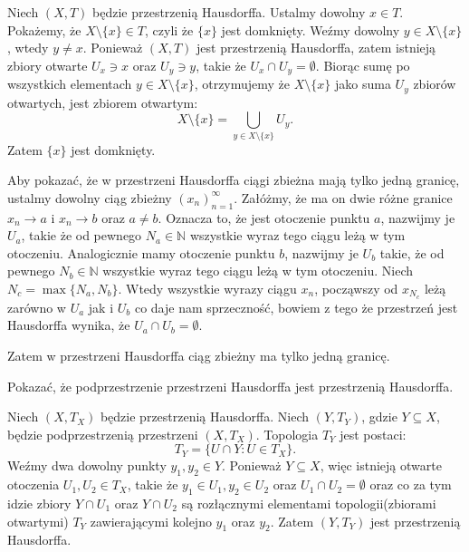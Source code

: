 \begin{solution}
	Niech $\left( X,T \right) $ będzie przestrzenią Hausdorffa. Ustalmy dowolny $x \in T$. Pokażemy, że $X \setminus \{x\} \in T $, czyli że $\{x\} $ jest domknięty. Weźmy dowolny $y \in X\setminus \{x\} $, wtedy $y \neq x$. Ponieważ $\left( X,T \right) $ jest przestrzenią Hausdorffa, zatem istnieją zbiory otwarte  $U_{x} \ni x$ oraz $U_{y} \ni y$, takie że $U_{x} \cap U_{y} = \emptyset$. Biorąc sumę po wszystkich elementach $y \in X\setminus \{x\} $, otrzymujemy że $X\setminus \{x\} $ jako suma $U_{y}$ zbiorów otwartych, jest zbiorem otwartym:
	\[
	X\setminus \{x\} = \bigcup_{y \in X\setminus \{x\} } U_{y}
	.\] 
Zatem $\{x\} $ jest domknięty.

Aby pokazać, że w przestrzeni Hausdorffa ciągi zbieżna mają tylko jedną granicę, ustalmy dowolny ciąg zbieżny $\left( x_{n} \right)_{n=1}^{\infty}$. Załóżmy, że ma on dwie różne granice $x_{n} \longrightarrow a$ i $x_{n} \longrightarrow b$ oraz $a\neq b$. Oznacza to, że jest otoczenie punktu $a$, nazwijmy je $U_{a}$, takie że od pewnego $N_{a} \in \mathbb{N}$ wszystkie wyraz tego ciągu leżą w tym otoczeniu. Analogicznie mamy otoczenie punktu  $b$, nazwijmy je $U_{b}$ takie, że od pewnego $N_{b} \in \mathbb{N}$ wszystkie wyraz tego ciągu leżą w tym otoczeniu. Niech $N_{c} = \max \{N_{a}, N_{b}\} $. Wtedy wszystkie wyrazy ciągu $x_{n}$, począwszy od  $x_{N_{c}}$ leżą zarówno w $U_{a}$ jak i $U_{b}$ co daje nam sprzeczność, bowiem z tego że przestrzeń jest Hausdorffa wynika, że $U_{a}\cap U_{b} = \emptyset$.

Zatem w przestrzeni Hausdorffa ciąg zbieżny ma tylko jedną granicę.
\end{solution} 
\begin{problem}[4]
	Pokazać, że podprzestrzenie przestrzeni Hausdorffa jest przestrzenią Hausdorffa.
\end{problem} 
\begin{solution}
	Niech $\left( X,T_{X} \right) $ będzie przestrzenią Hausdorffa. Niech $\left( Y, T_{Y} \right) $, gdzie $Y\subseteq X$, będzie podprzestrzenią przestrzeni $\left( X,T_{X} \right) $. Topologia $T_{Y}$ jest postaci:
	\[
	T_{Y} =  \{U \cap Y: U \in T_{X}\} 
	.\] 
Weźmy dwa dowolny punkty $y_1, y_2 \in Y$. Ponieważ $Y\subseteq X$, więc istnieją otwarte otoczenia $U_1,U_2 \in T_{X}$, takie że $y_1 \in U_1, y_2 \in U_2$ oraz $U_1 \cap U_2 = \emptyset$ oraz co za tym idzie zbiory $Y \cap U_1$ oraz $Y\cap U_2$ są rozłącznymi elementami topologii(zbiorami otwartymi) $T_{Y}$ zawierającymi kolejno $y_1$ oraz $y_2$. Zatem $\left( Y,T_{Y} \right) $ jest przestrzenią Hausdorffa.
\end{solution} 
